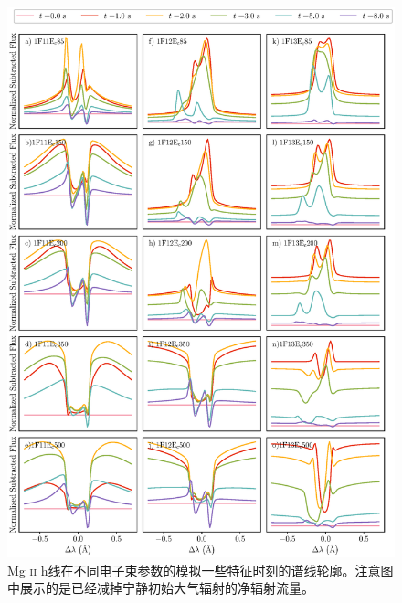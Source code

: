 \begin{figure}
	\centering
	\includegraphics[width=\textwidth]{figs/dMe_MgIIh_spec}
	\caption{Mg \textsc{ii} h线在不同电子束参数的模拟一些特征时刻的谱线轮廓。注意图中展示的是已经减掉宁静初始大气辐射的净辐射流量。}
	\label{fig:4.5}
\end{figure}

